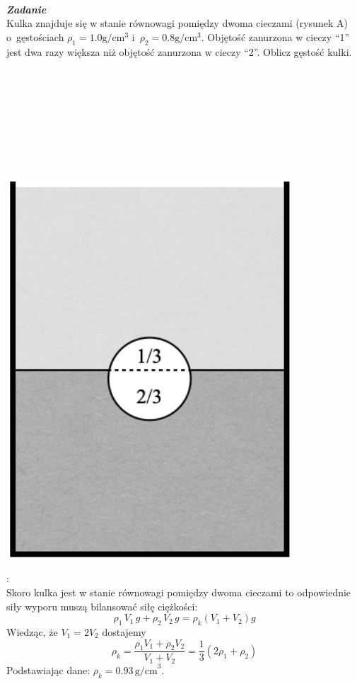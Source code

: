 \documentclass[11pt,a4paper]{article}
\newcounter{zadanie}\newcommand{\zadanie}[1][]{\addtocounter{zadanie}{1} ~\\  {\bf \emph{Zadanie \arabic{zadanie} #1 }} \\}
\begin{document}
\clearpage

\begin{minipage}{0.75\textwidth}
\zadanie
Kulka znajduje się w stanie równowagi pomiędzy dwoma cieczami (rysunek A) o~gęstościach $\rho_1 = 1.0\textrm{g}/\textrm{cm}^3$ i~$\rho_2 = 0.8\textrm{g}/\textrm{cm}^3$. Objętość zanurzona w cieczy ``1'' jest dwa razy większa niż objętość zanurzona w cieczy ``2''. Oblicz gęstość kulki.\\\\\\\\\\\\\\\\\\
\end{minipage}
\begin{minipage}{0.25\textwidth}
\begin{center}

\includegraphics[width=0.8\textwidth]{zadanie3.png}
\end{center}
\end{minipage}

\vspace{2mm}{\bf Rozwiązanie}:\\
Skoro kulka jest w stanie równowagi pomiędzy dwoma cieczami to odpowiednie siły wyporu muszą bilansować siłę ciężkości:
\[
\rho_1\,V_1\,g + \rho_2\,V_2\,g = \rho_k (V_1 + V_2) g
\]
Wiedząc, że $V_1 = 2 V_2$ dostajemy
\[
\rho_k = \frac{\rho_1 V_1 +\rho_2 V_2}{V_1 + V_2} = \frac{1}{3}(2\rho_1 +\rho_2)
\]
Podstawiając dane: $\rho_k = 0.93\,\textrm{g/cm}^3$.
\end{document}
